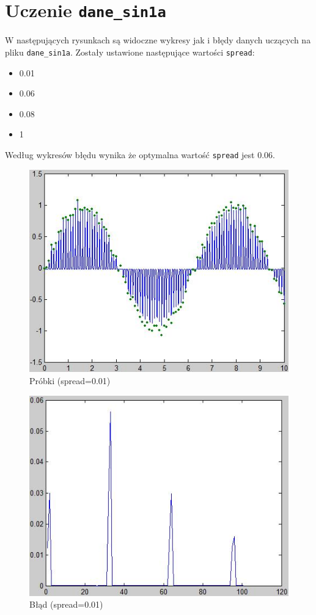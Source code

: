 \section{Uczenie \texttt{dane\_sin1a}}

W następujących rysunkach są widoczne wykresy jak i błędy danych uczących na pliku \texttt{dane\_sin1a}. Zostały ustawione następujące wartości \texttt{spread}:
\begin{itemize}
\item 0.01
\item 0.06
\item 0.08
\item 1
\end{itemize}

Według wykresów błędu wynika że optymalna wartość \texttt{spread} jest 0.06.

\begin{figure}[!h]
\centering
\includegraphics[scale=0.8]{src/0_01_wykres.png}\caption{\label{fig:0.01_wykres}Próbki (spread=0.01)}
\end{figure}

\begin{figure}[!h]
\centering
\includegraphics[scale=0.8]{src/0_01_blad.png}\caption{\label{fig:0.01_blad}Błąd (spread=0.01)}
\end{figure}

